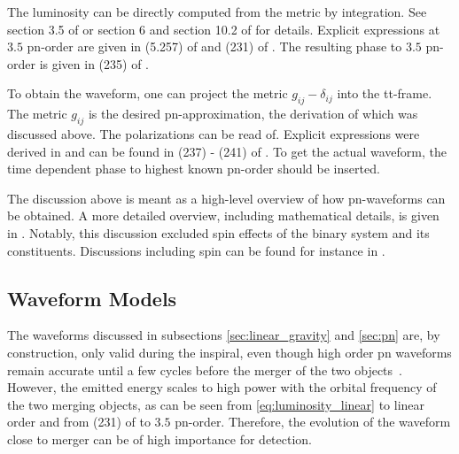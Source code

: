 The luminosity can be directly computed from the metric by integration. See section 3.5 of \cite{Maggiore:2008aaa} or section 6 and section 10.2 of \cite{Blanchet:2006aaa} for details. Explicit expressions at $3.5$ \acrshort{pn}-order are given in (5.257) of \cite{Maggiore:2008aaa} and (231) of \cite{Blanchet:2006aaa}. The resulting phase to $3.5$ \acrshort{pn}-order is given in (235) of \cite{Blanchet:2006aaa}.

To obtain the waveform, one can project the metric $g_{ij} - \delta_{ij}$ into the \acrshort{tt}-frame. The metric $g_{ij}$ is the desired \acrshort{pn}-approximation, the derivation of which was discussed above. The polarizations can be read of. Explicit expressions were derived in \cite{Blanchet:1996pi, Arun:2004ff} and can be found in (237) - (241) of \cite{Blanchet:2006aaa}. To get the actual waveform, the time dependent phase to highest known \acrshort{pn}-order should be inserted.

The discussion above is meant as a high-level overview of how \acrshort{pn}-waveforms can be obtained. A more detailed overview, including mathematical details, is given in \cite{Blanchet:2006aaa}. Notably, this discussion excluded spin effects of the binary system and its constituents. Discussions including spin can be found for instance in \cite{Damour:2001tu, Blanchet:2004ek, Faye:2006gx, Blanchet:2006gy, Damour:2007nc}.


\subsection{Waveform Models}
The waveforms discussed in subsections \ref{sec:linear_gravity} and \ref{sec:pn} are, by construction, only valid during the inspiral, even though high order \acrshort{pn} waveforms remain accurate until a few cycles before the merger of the two objects~\cite{Blanchet:2006aaa, Santamaria:2010yb}. %
However, the emitted energy scales to high power with the orbital frequency of the two merging objects, as can be seen from \eqref{eq:luminosity_linear} to linear order and from (231) of \cite{Blanchet:2006aaa} to $3.5$ \acrshort{pn}-order. Therefore, the evolution of the waveform close to merger can be of high importance for detection.

